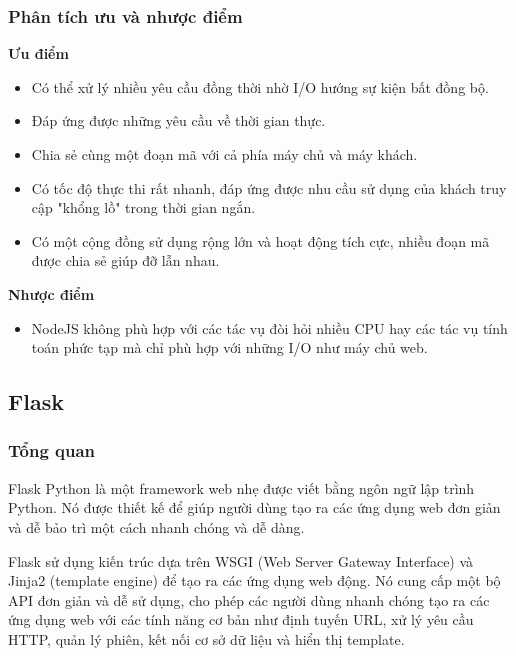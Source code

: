 \subsubsection{Phân tích ưu và nhược điểm}
\textbf{Ưu điểm}
\begin{itemize}
    \item Có thể xử lý nhiều yêu cầu đồng thời nhờ I/O hướng sự kiện bất đồng bộ.
    \item Đáp ứng được những yêu cầu về thời gian thực.
    \item Chia sẻ cùng một đoạn mã với cả phía máy chủ và máy khách.
    \item Có tốc độ thực thi rất nhanh, đáp ứng được nhu cầu sử dụng của khách truy cập "khổng lồ" trong thời gian ngắn.
    \item Có một cộng đồng sử dụng rộng lớn và hoạt động tích cực, nhiều đoạn mã được chia sẻ giúp đỡ lẫn nhau.
\end{itemize}
\textbf{Nhược điểm}
\begin{itemize}
    \item NodeJS không phù hợp với các tác vụ đòi hỏi nhiều CPU hay các tác vụ tính toán phức tạp mà chỉ phù hợp với những I/O như máy chủ web.
\end{itemize}
\subsection{Flask}
\subsubsection{Tổng quan}
Flask Python là một framework web nhẹ được viết bằng ngôn ngữ lập trình Python. Nó được thiết kế để giúp người dùng tạo ra các ứng dụng web đơn giản và dễ bảo trì một cách nhanh chóng và dễ dàng.

Flask sử dụng kiến trúc dựa trên WSGI (Web Server Gateway Interface) và Jinja2 (template engine) để tạo ra các ứng dụng web động. Nó cung cấp một bộ API đơn giản và dễ sử dụng, cho phép các người dùng nhanh chóng tạo ra các ứng dụng web với các tính năng cơ bản như định tuyến URL, xử lý yêu cầu HTTP, quản lý phiên, kết nối cơ sở dữ liệu và hiển thị template.
